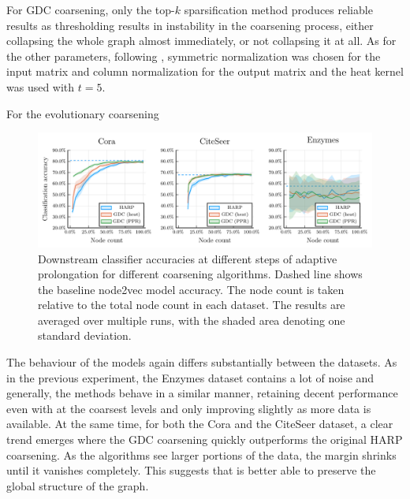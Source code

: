 For GDC coarsening, only the top-\( k \) sparsification method produces reliable results as thresholding results in instability in the coarsening process, either collapsing the whole graph almost immediately, or not collapsing it at all. As for the other parameters, following \cite{gasteiger_diffusion_2019}, symmetric normalization was chosen for the input matrix and column normalization for the output matrix and the heat kernel was used with \( t = 5 \).

For the evolutionary coarsening 

\begin{figure}
  \centering
  \includegraphics[width=\linewidth]{images/coarsening-algorithms/coarsening-algorithms.pdf}
  \caption{Downstream classifier accuracies at different steps of adaptive prolongation for different coarsening algorithms. Dashed line shows the baseline node2vec model accuracy. The node count is taken relative to the total node count in each dataset. The results are averaged over multiple runs, with the shaded area denoting one standard deviation.}
  \label{fig:coarsening-algorithms}
\end{figure}

The behaviour of the models again differs substantially between the datasets. As in the previous experiment, the Enzymes dataset contains a lot of noise and generally, the methods behave in a similar manner, retaining decent performance even with at the coarsest levels and only improving slightly as more data is available. At the same time, for both the Cora and the CiteSeer dataset, a clear trend emerges where the GDC coarsening quickly outperforms the original HARP coarsening. As the algorithms see larger portions of the data, the margin shrinks until it vanishes completely. This suggests that is better able to preserve the global structure of the graph.
